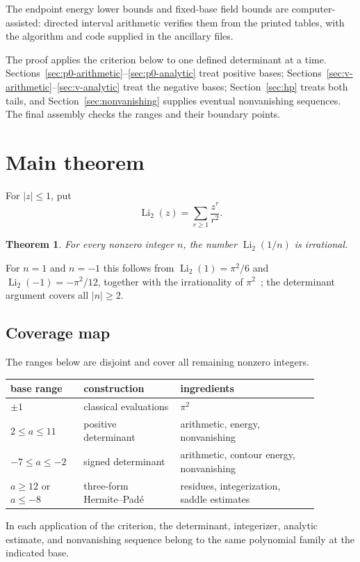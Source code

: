 \documentclass{amsart}
\newtheorem{theorem}{Theorem}[section]
\numberwithin{equation}{section}
\numberwithin{table}{section}
\newcommand{\Li}{\operatorname{Li}}
\begin{document}
The endpoint energy lower bounds and fixed-base field bounds are
computer-assisted: directed interval arithmetic verifies them from the
printed tables, with the algorithm and code supplied in the ancillary files.

The proof applies the criterion below to one defined determinant at a time.
Sections~\ref{sec:p0-arithmetic}--\ref{sec:p0-analytic} treat positive bases;
Sections~\ref{sec:v-arithmetic}--\ref{sec:v-analytic} treat the negative
bases; Section~\ref{sec:hp} treats both tails, and
Section~\ref{sec:nonvanishing} supplies eventual nonvanishing sequences.  The final
assembly checks the ranges and their boundary points.

\section{Main theorem}
For \(|z|\le1\), put
\[
  \Li_2(z)=\sum_{r\ge1}\frac{z^r}{r^2}.
\]
\begin{theorem}\label{thm:main}
For every nonzero integer $n$, the number $\Li_2(1/n)$ is irrational.
\end{theorem}

For $n=1$ and $n=-1$ this follows from
\(\Li_2(1)=\pi^2/6\) and \(\Li_2(-1)=-\pi^2/12\), together with the
irrationality of $\pi^2$~\cite{Legendre}; the determinant argument covers all
$|n|\ge2$.

\subsection{Coverage map}
The ranges below are disjoint and cover all remaining nonzero integers.
\begin{center}\normalsize
\begin{tabular}{@{}p{0.20\linewidth}p{0.28\linewidth}p{0.40\linewidth}@{}}
\toprule
base range & construction & ingredients\\
\midrule
\(\pm1\) & classical evaluations & $\pi^2$\\
\(2\le a\le11\) & positive determinant & arithmetic, energy, nonvanishing\\
\(-7\le a\le-2\) & signed determinant & arithmetic, contour energy, nonvanishing\\
\(a\ge12\) or \(a\le-8\) & three-form Hermite--Pad\'e & residues, integerization, saddle estimates\\
\bottomrule
\end{tabular}
\end{center}
In each application of the criterion, the determinant, integerizer, analytic
estimate, and nonvanishing sequence belong to the same polynomial family at the
indicated base.
\end{document}
